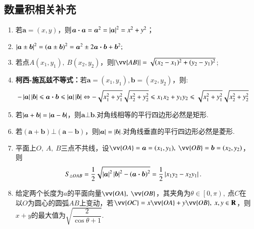\documentclass{BHCexam}
\begin{document}
\subsection{数量积相关补充}
\begin{enumerate}[(1)]
\item 若$\bm{a}=\left(x,y\right)$，则$ \bm{a}\bm{\cdot}\bm{a}=\bm{a}^2=\left|\bm{a}\right|^2=x^2+y^2 $；
\item $ \left|\bm{a}\pm \bm{b}\right|^2=\left(\bm{a}\pm \bm{b}\right)^2=\bm{a}^2\pm2\bm{a}\bm{\cdot}\bm{b}+\bm{b}^2 ;$
\item 若点$ A(x_1,y_1),~B(x_2,y_2) $，则$ \abs{\vv{AB}}=\sqrt{(x_2-x_1)^2+(y_2-y_1)^2} $;
\item \textbf{柯西-施瓦兹不等式：}若$\bm{a}=\left(x_1,y_1\right),\bm{b}=\left(x_2,y_2\right)$，则:$$ -\left|\bm{a}\right|\left|\bm{b}\right|\leqslant\bm{a}\bm{\cdot}\bm{b}\leqslant\left|\bm{a}\right|\left|\bm{b}\right|\Leftrightarrow -\sqrt{x_1^2+y_1^2}\sqrt{x_2^2+y_2^2}\leqslant x_1x_2+y_1y_2\leqslant \sqrt{x_1^2+y_1^2}\sqrt{x_2^2+y_2^2}$$
\item 若$ \left|\bm{a}+\bm{b}\right|=\left|\bm{a}-\bm{b}\right| $，则$ \bm{a}\bot\bm{b} $.对角线相等的平行四边形必然是矩形.
\item 若$ \left(\bm{a}+\bm{b}\right)\bm{\bot}\left(\bm{a}-\bm{b}\right) $，则$\left|\bm{a}\right|=\left|\bm{b}\right| $.对角线垂直的平行四边形必然是菱形.
\item 平面上$ O,~A,~B $三点不共线，设$\vv{OA}=\bm{a}=(x_1,y_1) ,~\vv{OB}=\bm{b}=(x_2,y_2)$，则$$ S_{\triangle OAB}=\dfrac{1}{2}\sqrt{\left|\bm{a}\right|^2\left|\bm{b}\right|^2-\left(\bm{a}\bm{\cdot}\bm{b}\right)^2}=\dfrac{1}{2}\left|x_1y_2-x_2y_1\right| .$$
\item 给定两个长度为$ a $的平面向量$ \vv{OA},~\vv{OB} $，其夹角为$ \theta\in\left[0,\pi \right), ~$点$ C $在以$ O $为圆心的圆弧$ AB $上变动，若$ \vv{OC}=x\vv{OA}+y\vv{OB},~x,y\inR $，则$ x+y $的最大值为$ \sqrt{\dfrac{2}{\cos\theta+1}}. $
\end{enumerate}
\end{document}
